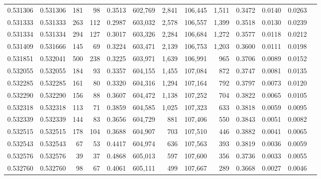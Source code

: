 \begin{tabular}{rrrrrrrrrrrrr}
0.531306 & 0.531306 &   181 &    98 &                                     0.3513 & 602,769 &   2,841 & 106,445 &   1,511 & 0.3472 & 0.0140 & 0.0263 \\
0.531333 & 0.531333 &   263 &   112 &                                     0.2987 & 603,032 &   2,578 & 106,557 &   1,399 & 0.3518 & 0.0130 & 0.0239 \\
0.531334 & 0.531334 &   294 &   127 &                                     0.3017 & 603,326 &   2,284 & 106,684 &   1,272 & 0.3577 & 0.0118 & 0.0212 \\
0.531409 & 0.531666 &   145 &    69 &                                     0.3224 & 603,471 &   2,139 & 106,753 &   1,203 & 0.3600 & 0.0111 & 0.0198 \\
0.531851 & 0.532041 &   500 &   238 &                                     0.3225 & 603,971 &   1,639 & 106,991 &     965 & 0.3706 & 0.0089 & 0.0152 \\
0.532055 & 0.532055 &   184 &    93 &                                     0.3357 & 604,155 &   1,455 & 107,084 &     872 & 0.3747 & 0.0081 & 0.0135 \\
0.532285 & 0.532285 &   161 &    80 &                                     0.3320 & 604,316 &   1,294 & 107,164 &     792 & 0.3797 & 0.0073 & 0.0120 \\
0.532290 & 0.532290 &   156 &    88 &                                     0.3607 & 604,472 &   1,138 & 107,252 &     704 & 0.3822 & 0.0065 & 0.0105 \\
0.532318 & 0.532318 &   113 &    71 &                                     0.3859 & 604,585 &   1,025 & 107,323 &     633 & 0.3818 & 0.0059 & 0.0095 \\
0.532339 & 0.532339 &   144 &    83 &                                     0.3656 & 604,729 &     881 & 107,406 &     550 & 0.3843 & 0.0051 & 0.0082 \\
0.532515 & 0.532515 &   178 &   104 &                                     0.3688 & 604,907 &     703 & 107,510 &     446 & 0.3882 & 0.0041 & 0.0065 \\
0.532543 & 0.532543 &    67 &    53 &                                     0.4417 & 604,974 &     636 & 107,563 &     393 & 0.3819 & 0.0036 & 0.0059 \\
0.532576 & 0.532576 &    39 &    37 &                                     0.4868 & 605,013 &     597 & 107,600 &     356 & 0.3736 & 0.0033 & 0.0055 \\
0.532760 & 0.532760 &    98 &    67 &                                     0.4061 & 605,111 &     499 & 107,667 &     289 & 0.3668 & 0.0027 & 0.0046 \\

\end{tabular}
